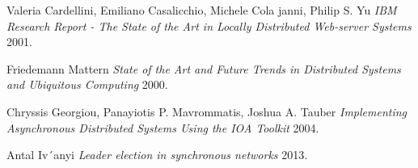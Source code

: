 

\begin{thebibliography}{1}

 Valeria Cardellini, Emiliano Casalicchio, Michele Cola janni, Philip S. Yu {\em IBM Research Report - The State of the Art in Locally Distributed Web-server Systems}  2001.

 Friedemann Mattern  {\em State of the Art and Future Trends in Distributed Systems and Ubiquitous Computing} 2000.

 Chryssis Georgiou, Panayiotis P. Mavrommatis, Joshua A. Tauber {\em Implementing Asynchronous Distributed Systems Using the IOA Toolkit} 2004.

 Antal Iv´anyi {\em Leader election in synchronous networks} 2013.


\end{thebibliography}